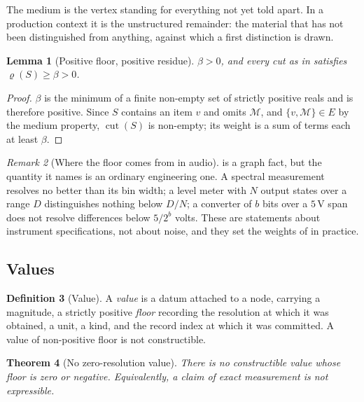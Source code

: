 \documentclass[11pt,twocolumn,a4paper]{article}
\newtheorem{theorem}{Theorem}[section]
\newtheorem{lemma}[theorem]{Lemma}
\theoremstyle{definition}
\newtheorem{definition}[theorem]{Definition}
\theoremstyle{remark}
\newtheorem{remark}[theorem]{Remark}
\newcommand{\flo}{\beta}
\newcommand{\med}{\mathcal{M}}
\newcommand{\cut}{\operatorname{cut}}
\newcommand{\res}{\varrho}
\begin{document}
The medium is the vertex standing for everything not yet told apart. In a
production context it is the unstructured remainder: the material that has not
been distinguished from anything, against which a first distinction is drawn.

\begin{lemma}[Positive floor, positive residue]
\label{lem:floor}
$\flo>0$, and every cut as in  satisfies
$\res(S)\ge\flo>0$.
\end{lemma}

\begin{proof}
$\flo$ is the minimum of a finite non-empty set of strictly positive reals and is
therefore positive. Since $S$ contains an item $v$ and omits $\med$, and
$\{v,\med\}\in E$ by the medium property, $\cut(S)$ is non-empty; its weight is a
sum of terms each at least $\flo$.
\end{proof}

\begin{remark}[Where the floor comes from in audio]
\label{rem:audio-floor}
 is a graph fact, but the quantity it names is an ordinary
engineering one. A spectral measurement resolves no better than its bin width; a
level meter with $N$ output states over a range $D$ distinguishes nothing below
$D/N$; a converter of $b$ bits over a $5$\,V span does not resolve differences
below $5/2^{b}$ volts. These are statements about instrument specifications, not
about noise, and they set the weights of  in practice.
\end{remark}

\subsection{Values}

\begin{definition}[Value]
\label{def:value}
A \emph{value} is a datum attached to a node, carrying a magnitude, a strictly
positive \emph{floor} recording the resolution at which it was obtained, a unit,
a kind, and the record index at which it was committed. A value of non-positive
floor is not constructible.
\end{definition}

\begin{theorem}[No zero-resolution value]
\label{thm:no-zero}
There is no constructible value whose floor is zero or negative. Equivalently, a
claim of exact measurement is not expressible.
\end{theorem}
\end{document}
